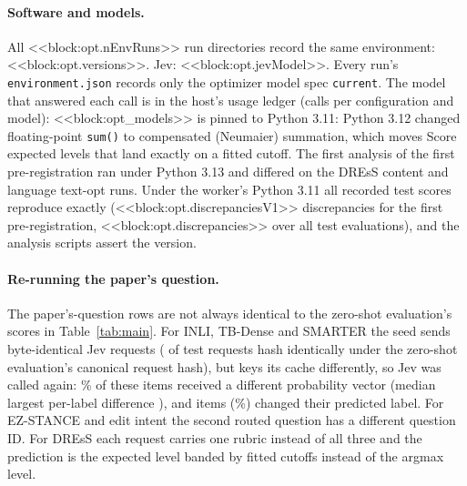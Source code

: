 \paragraph{Software and models.}
All <<block:opt.nEnvRuns>> run directories record the same environment: <<block:opt.versions>>. Jev: <<block:opt.jevModel>>. Every run's \texttt{environment.json} records only the optimizer model spec \texttt{current}. The model that answered each call is in the host's usage ledger (calls per configuration and model): <<block:opt_models>> \jevopt{} is pinned to Python 3.11: Python 3.12 changed floating-point \texttt{sum()} to compensated (Neumaier) summation, which moves Score expected levels that land exactly on a fitted cutoff. The first analysis of the first pre-registration ran under Python 3.13 and differed on the DREsS content and language text-opt runs. Under the worker's Python 3.11 all recorded test scores reproduce exactly (<<block:opt.discrepanciesV1>> discrepancies for the first pre-registration, <<block:opt.discrepancies>> over all test evaluations), and the analysis scripts assert the version.

\paragraph{Re-running the paper's question.}
The paper's-question rows are not always identical to the zero-shot evaluation's scores in Table~\ref{tab:main}. For INLI, TB-Dense and SMARTER the seed sends byte-identical Jev requests (\bodyRerunIdentical{} of \bodyRerunN{} test requests hash identically under the zero-shot evaluation's canonical request hash), but \jevopt{} keys its cache differently, so Jev was called again: \bodyRerunChangedPct\% of these items received a different probability vector (median largest per-label difference \bodyRerunMedDiff), and \bodyRerunFlips{} items (\bodyRerunFlipPct\%) changed their predicted label. For EZ-STANCE and edit intent the second routed question has a different question ID. For DREsS each request carries one rubric instead of all three and the prediction is the expected level banded by fitted cutoffs instead of the argmax level.
